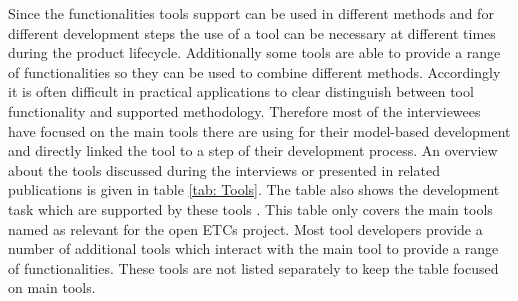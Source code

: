 \documentclass{./template/openetcs_report}
\begin{document}
Since the functionalities tools support can be used in different methods and for different development steps the use of a tool can be necessary at different times during the product lifecycle. Additionally some tools are able to provide a range of functionalities so they can be used to combine different methods. Accordingly it is  often difficult in practical applications to clear distinguish between tool functionality and supported methodology. Therefore most of the interviewees have focused on the main tools there are using for their model-based development and directly linked the tool to a step of their development process. An overview about the tools discussed during the interviews or presented in related publications is given in table \ref{tab: Tools}. The table also shows the development task which are supported by these tools . This table only covers the main tools named as relevant for the open ETCs project. Most tool developers provide a number of additional tools which interact with the main tool to provide a range of functionalities. These tools are not listed separately to keep the table focused on main tools.

\end{document}
